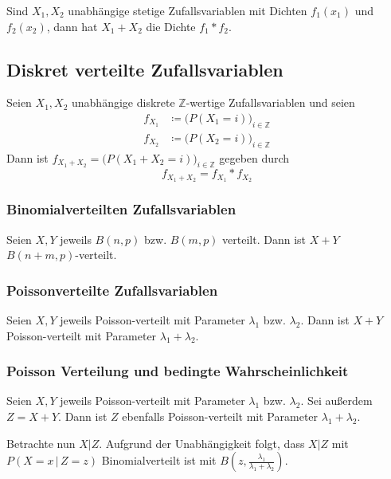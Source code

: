 \documentclass[a4paper, 11pt, accentcolor = tud3b]{tudreport}
\begin{document}
                Sind \( X_1, X_2 \) unabhängige stetige Zufallsvariablen mit Dichten \( f_1(x_1) \) und \( f_2(x_2) \), dann hat \( X_1 + X_2 \) die Dichte \( f_1 \ast f_2 \).
                
			\subsection{Diskret verteilte Zufallsvariablen}
				Seien \( X_1, X_2 \) unabhängige diskrete \( \mathbb{Z} \)-wertige Zufallsvariablen und seien
				\begin{align*}
					f_{X_1} & \coloneqq \big( P(X_1 = i) \big) _ { i \in \mathbb{Z} } \\
					f_{X_2} & \coloneqq \big( P(X_2 = i) \big) _ { i \in \mathbb{Z} }
				\end{align*}
				Dann ist \( f_{X_1 + X_2} = \big( P(X_1 + X_2 = i) \big)_{i \in \mathbb{Z}} \) gegeben durch
				\begin{equation*}
					f_{X_1 + X_2} = f_{X_1} \ast f_{X_2}
				\end{equation*}
				
				\subsubsection{Binomialverteilten Zufallsvariablen}
					Seien \(X, Y\) jeweils \( B(n, p) \) bzw. \( B(m, p) \) verteilt. Dann ist \( X + Y \) \( B(n + m, p) \)-verteilt.
				
				\subsubsection{Poissonverteilte Zufallsvariablen}
					Seien \(X, Y\) jeweils Poisson-verteilt mit Parameter \( \lambda_1 \) bzw. \( \lambda_2 \). Dann ist \( X + Y \) Poisson-verteilt mit Parameter \( \lambda_1 + \lambda_2 \).
				
				\subsubsection{Poisson Verteilung und bedingte Wahrscheinlichkeit}
					Seien \(X, Y\) jeweils Poisson-verteilt mit Parameter \( \lambda_1 \) bzw. \( \lambda_2 \). Sei außerdem \( Z = X + Y \). Dann ist \(Z\) ebenfalls Poisson-verteilt mit Parameter \( \lambda_1 + \lambda_2 \).
				
					Betrachte nun \( X \vert Z \).  Aufgrund der Unabhängigkeit folgt, dass \( X \vert Z \) mit \( P(X = x \,\vert\, Z = z) \) Binomialverteilt ist mit \( B(z, \frac{\lambda_1}{\lambda_1 + \lambda_2}) \).
				
\end{document}
